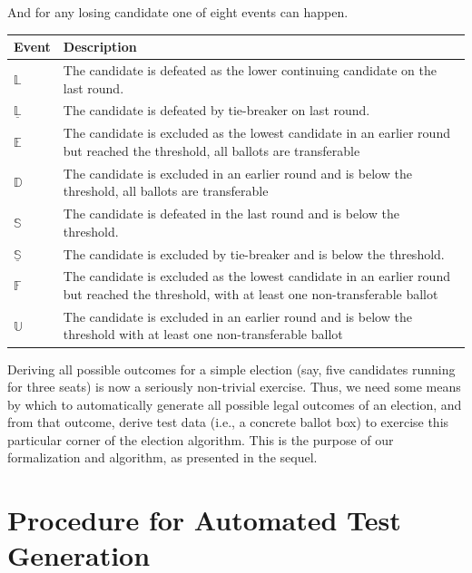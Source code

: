 \documentclass[runningheads,a4paper]{llncs}
\newcommand{\ie}{i.e.,\xspace}
\newcommand{\earlyloser}{\ensuremath{\mathbb{E}}}
\newcommand{\earlyloserNT}{\ensuremath{\mathbb{F}}}
\newcommand{\loser}{\ensuremath{\mathbb{L}}}
\newcommand{\belowthreshold}{\ensuremath{\mathbb{S}}}
\newcommand{\earlybelowthreshold}{\ensuremath{\mathbb{D}}}
\newcommand{\earlybelowthresholdNT}{\ensuremath{\mathbb{U}}}
\newcommand{\tiebreak}[1]{\ensuremath{\underline{#1}}}
\begin{document}
\noindent And for any losing candidate one of eight events can happen.
\begin{center}
  \begin{longtable}{l|p{}}
    Event & Description \\
    \hline
    \loser & The candidate is defeated as the lower continuing
    candidate on the last round. \\
    \tiebreak{\loser} & The candidate is defeated by tie-breaker on
    last round. \\
    \earlyloser & The candidate is excluded as the lowest candidate in
    an earlier round but reached the threshold, all ballots are transferable \\
    \earlybelowthreshold & The candidate is excluded in an earlier round and
    is below the threshold, all ballots are transferable \\
    \belowthreshold & The candidate is defeated in the last round and is below the
    threshold. \\
    \tiebreak{\belowthreshold} & The candidate is excluded by tie-breaker
    and is below the threshold. \\
    \earlyloserNT & The candidate is excluded as the lowest candidate in
    an earlier round but reached the threshold, with at least one
    non-transferable ballot \\
    \earlybelowthresholdNT & The candidate is excluded in an earlier round and
    is below the threshold with at least one non-transferable ballot \\
  \end{longtable}
\end{center}

Deriving all possible outcomes for a simple election (say, five
candidates running for three seats) is now a seriously non-trivial
exercise.  Thus, we need some means by which to automatically generate
all possible legal outcomes of an election, and from that outcome,
derive test data (\ie a concrete ballot box) to exercise this
particular corner of the election algorithm.  This is the purpose of
our formalization and algorithm, as presented in the sequel.

\section{Procedure for Automated Test Generation}
\label{sec:proc-autom-test}
\end{document}
